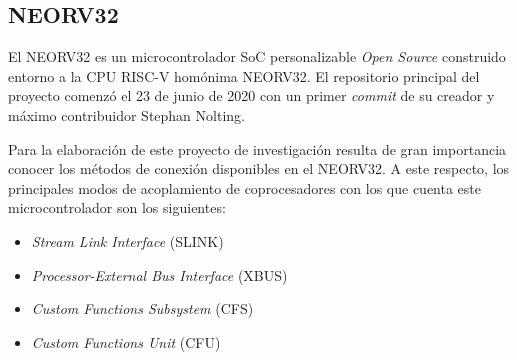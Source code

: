 
\subsection{NEORV32}

    
El NEORV32 es un microcontrolador SoC personalizable \textit{Open Source} construido entorno a la CPU RISC-V homónima NEORV32.
El repositorio principal del proyecto comenzó el 23 de junio de 2020 con un primer \textit{commit} de su creador y máximo contribuidor Stephan Nolting.

Para la elaboración de este proyecto de investigación resulta de gran importancia conocer los métodos de conexión disponibles en el NEORV32.
A este respecto, los principales modos de acoplamiento de coprocesadores con los que cuenta este microcontrolador son los siguientes:

\begin{itemize}
    \item \textit{Stream Link Interface} (SLINK)
    \item \textit{Processor-External Bus Interface} (XBUS)
    \item \textit{Custom Functions Subsystem} (CFS)
    \item \textit{Custom Functions Unit} (CFU)
\end{itemize} 

